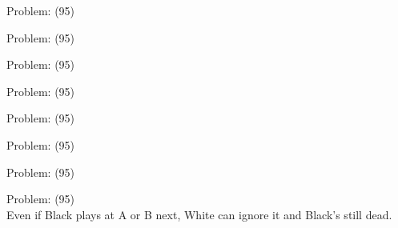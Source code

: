 \documentclass[11pt]{article}
\begin{document}
\begin{minipage}[t]{0.5\textwidth}
  {\centering
  
Problem: (95)\\
  }
\end{minipage}
\begin{minipage}[t]{0.5\textwidth}
  {\centering
  
Problem: (95)\\
  }
\end{minipage}
\begin{minipage}[t]{0.5\textwidth}
  {\centering
  
Problem: (95)\\
  }
\end{minipage}
\begin{minipage}[t]{0.5\textwidth}
  {\centering
  
Problem: (95)\\
  }
\end{minipage}
\begin{minipage}[t]{0.5\textwidth}
  {\centering
  
Problem: (95)\\
  }
\end{minipage}
\begin{minipage}[t]{0.5\textwidth}
  {\centering
  
Problem: (95)\\
  }
\end{minipage}
\begin{minipage}[t]{0.5\textwidth}
  {\centering
  
Problem: (95)\\
  }
\end{minipage}
\begin{minipage}[t]{0.5\textwidth}
  {\centering
  
Problem: (95)\\
Even if Black plays at A or B next, White can ignore it and Black's still dead.\\
  }
\end{minipage}
\end{document}
